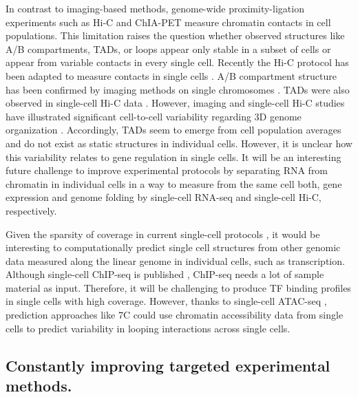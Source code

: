 \documentclass[a4paper,twoside=true,openright,parskip=full,chapterprefix=true,11pt,headings=normal,bibliography=totoc,listof=totoc,titlepage=on,captions=tableabove,draft=false]{scrreprt}
\theoremstyle{definition}
\theoremstyle{definition}
\theoremstyle{definition}
\theoremstyle{remark}
\begin{document}
In contrast to imaging-based methods, genome-wide proximity-ligation
experiments such as Hi-C and ChIA-PET measure chromatin contacts in cell
populations. This limitation raises the question whether observed
structures like A/B compartments, TADs, or loops appear only stable in a
subset of cells or appear from variable contacts in every single cell.
Recently the Hi-C protocol has been adapted to measure contacts in
single cells \citep{Sekelja2016, Ulianov2017}. A/B compartment structure
has been confirmed by imaging methods on single chromosomes
\citep{Wang2016d}. TADs were also observed in single-cell Hi-C data
\citep{Nagano2013}. However, imaging and single-cell Hi-C studies have
illustrated significant cell-to-cell variability regarding 3D genome
organization \citep{Nagano2013, Ramani2016, Flyamer2017, Stevens2017}.
Accordingly, TADs seem to emerge from cell population averages and do
not exist as static structures in individual cells. However, it is
unclear how this variability relates to gene regulation in single cells.
It will be an interesting future challenge to improve experimental
protocols by separating RNA from chromatin in individual cells in a way
to measure from the same cell both, gene expression and genome folding
by single-cell RNA-seq and single-cell Hi-C, respectively.

Given the sparsity of coverage in current single-cell protocols
\citep{Nagano2013, Flyamer2017, Stevens2017}, it would be interesting to
computationally predict single cell structures from other genomic data
measured along the linear genome in individual cells, such as
transcription. Although single-cell ChIP-seq is published
\citep{Rotem2015}, ChIP-seq needs a lot of sample material as input.
Therefore, it will be challenging to produce TF binding profiles in
single cells with high coverage. However, thanks to single-cell ATAC-seq
\citep{Buenrostro2015}, prediction approaches like 7C could use
chromatin accessibility data from single cells to predict variability in
looping interactions across single cells.

\hypertarget{constantly-improving-targeted-experimental-methods.}{%
\subsection{Constantly improving targeted experimental
methods.}\label{constantly-improving-targeted-experimental-methods.}}
\end{document}
